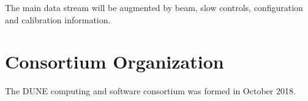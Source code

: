 The main data stream will be augmented by beam, slow controls,  configuration and calibration information. 


\section{Consortium Organization}

The DUNE computing and software consortium was formed in October 2018.  















